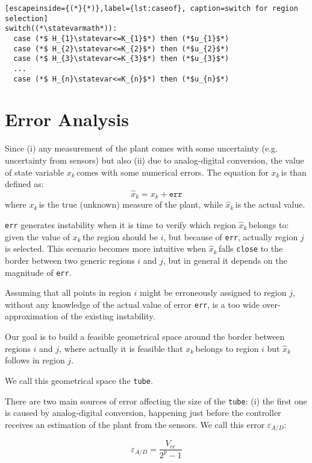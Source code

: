 \documentclass[sigconf]{acmart}
\newcommand{\statevar}{x_{k}}
\newcommand{\statevarmath}{$x_{k}\,$}
\newcommand{\qstatevar}{\hat{x}_{k}}
\newcommand{\qstatevarmath}{$\hat{x}_{k}\,$}
\begin{document}
\begin{lstlisting}[escapeinside={(*}{*)},label={lst:caseof}, caption=switch for region selection]
switch((*\statevarmath*)):
  case (*$ H_{1}\statevar<=K_{1}$*) then (*$u_{1}$*)
  case (*$ H_{2}\statevar<=K_{2}$*) then (*$u_{2}$*)
  case (*$ H_{3}\statevar<=K_{3}$*) then (*$u_{3}$*)
  ...
  case (*$ H_{n}\statevar<=K_{n}$*) then (*$u_{n}$*)
\end{lstlisting}

\section{Error Analysis}
Since (i) any measurement of the plant comes with some uncertainty (e.g. uncertainty from sensors) but also (ii) due to analog-digital conversion, the value of state variable \statevarmath comes with some numerical errors. The equation for \statevarmath is than defined as:
\begin{equation}
\qstatevar=\statevar + \texttt{err}
\end{equation}
where \statevarmath is the true (unknown) measure of the plant, while \qstatevarmath is the actual value.

\texttt{err} generates instability when it is time to verify which region \qstatevarmath belongs to: given the value of \statevarmath the region should be $i$, but because of \texttt{err}, actually region $j$ is selected. This scenario becomes more intuitive when \qstatevarmath falls \texttt{close} to the border between two generic regions $i$ and $j$, but in general it depends on the magnitude of \texttt{err}.

Assuming that all points in region $i$ might be erroneously assigned to region $j$, without any  knowledge of the actual value of error \texttt{err}, is a too wide over-approximation of the existing instability. 

Our goal is to build a feasible geometrical space around the border between regions $i$ and $j$, where actually it is feasible that \statevarmath belongs to region $i$ but \qstatevarmath follows in region $j$.

We call this geometrical space the \texttt{tube}.

There are two main sources of error affecting the size of the \texttt{tube}: (i) the first one is caused by analog-digital conversion, happening just before the controller receives an estimation of the plant from the sensors. We call this error $\varepsilon_{A/D}$: 

\begin{equation}\nonumber
\varepsilon_{A/D}=\frac{V_{cc}}{2^{p}-1}
\end{equation}
\end{document}

